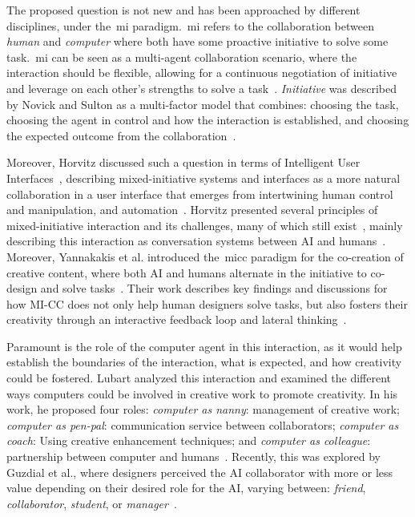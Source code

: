 The proposed question is not new and has been approached by different disciplines, under the~\acrfull{mi} paradigm.~\acrshort{mi} refers to the collaboration between \emph{human} and \emph{computer} where both have some proactive initiative to solve some task.~\acrshort{mi} can be seen as a multi-agent collaboration scenario, where the interaction should be flexible, allowing for a continuous negotiation of initiative and leverage on each other's strengths to solve a task~\cite{allen_mixed-initiative_1999}. \emph{Initiative} was described by Novick and Sulton as a multi-factor model that combines: choosing the task, choosing the agent in control and how the interaction is established, and choosing the expected outcome from the collaboration~\cite{novick_what_1997}. 

Moreover, Horvitz discussed such a question in terms of Intelligent User Interfaces~\cite{birnbaum_compelling_1997}, describing mixed-initiative systems and interfaces as a more natural collaboration in a user interface that emerges from intertwining human control and manipulation, and automation~\cite{horvitz_uncertainty_1999}. Horvitz presented several principles of mixed-initiative interaction and its challenges, many of which still exist~\cite{horvitz_principles_1999}, mainly describing this interaction as conversation systems between AI and humans~\cite{horvitz_computational_1999}. Moreover, Yannakakis et al. introduced the~\acrfull{micc} paradigm for the co-creation of creative content, where both AI and humans alternate in the initiative to co-design and solve tasks~\cite{yannakakis_mixed-initiative_2014}. Their work describes key findings and discussions for how MI-CC does not only help human designers solve tasks, but also fosters their creativity through an interactive feedback loop and lateral thinking~\cite{liapis_can_2016,liapis_computational_2014,alvarez_fostering_2018}.



Paramount is the role of the computer agent in this interaction, as it would help establish the boundaries of the interaction, what is expected, and how creativity could be fostered. Lubart analyzed this interaction and examined the different ways computers could be involved in creative work to promote creativity. In his work, he proposed four roles: \emph{computer as nanny}: management of creative work; \emph{computer as pen-pal}: communication service between collaborators; \emph{computer as coach}: Using creative enhancement techniques; and \emph{computer as colleague}: partnership between computer and humans~\cite{lubart_how_2005}. Recently, this was explored by Guzdial et al., where designers perceived the AI collaborator with more or less value depending on their desired role for the AI, varying between: \emph{friend}, \emph{collaborator}, \emph{student}, or \emph{manager}~\cite{guzdial_friend_2019}.

